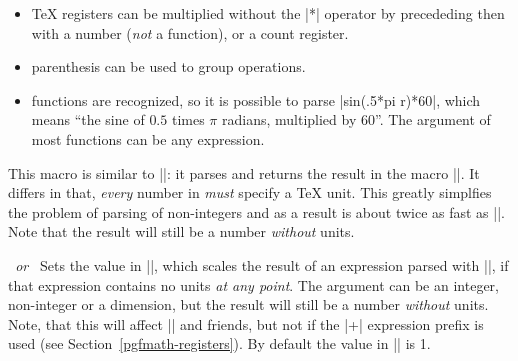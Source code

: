 \begin{itemize}
\begin{codeexample}[post=\tt\footnotesize\pgfmathresult]
\pgf@x=56.78pt
\pgfmathparse{\pgf@x+\the\pgf@x}
\end{codeexample}

	\item \TeX{} registers can be multiplied without the |*| operator
	by precededing then with a number (\emph{not} a function), or a
	count register.
	 
\begin{codeexample}[post=\tt\footnotesize\pgfmathresult]
\pgf@x=10pt
%
\end{codeexample}

	\item parenthesis can be used to group operations.

\begin{codeexample}[post=\tt\footnotesize\pgfmathresult]
\end{codeexample}

	\item functions are recognized, so it is possible to parse
	|sin(.5*pi r)*60|, which means ``the sine of $0.5$ times $\pi$ 
	radians, multiplied by 60''. The argument of most functions can
	be any expression.

\begin{codeexample}[post=\tt\footnotesize\pgfmathresult]
\end{codeexample}

\end{itemize}

\begin{command}{\pgfmathqparse{}}

	This macro is similar to |\pgfmathparse|: it parses 
	 and returns the result in the macro 
	|\pgfmathresult|. It differs in that, \emph{every} number in
	 \emph{must} specify a \TeX{} unit. This greatly
	simplfies the problem of parsing of non-integers and as a result
	is about twice as fast as |\pgfmathparse|. Note that the result will 
	still be a number \emph{without} units.	
\end{command}

\begin{command}{\pgfmathsetresultunitscale{}\textsl{\ or\ }}
	Sets the value in |\pgfmathresultunitscale|, which scales the result
	of an expression parsed with |\pgfmathparse|, if that expression
	contains no units	\emph{at any point}. The argument can be an integer,
	non-integer or a dimension, but the result will still be a number 
	\emph{without} units. Note, that this will affect |\pgfmathsetlength| 
	and friends, but not if the |+| expression prefix is used 
	(see Section~\ref{pgfmath-registers}). By default the value in
	|\pgfmathresultunitscale| is 1.
\end{command}


